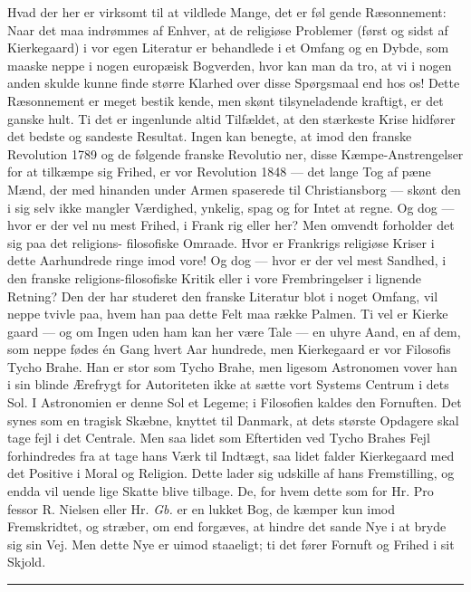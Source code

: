 \documentclass[12pt,a4paper,openany]{book}
\newcommand{\piecerule}{\par\begin{center}\rule{1.5cm}{0.4pt}\end{center}\par}
\newcommand{\opage}[1]{\marginnote{\footnotesize\textit{[#1]}}}
\begin{document}
Hvad der her er virksomt til at vildlede Mange, det er føl\-%
gende Ræsonnement: Naar det maa indrømmes af Enhver, at
de religiøse Problemer (først og sidst af Kierkegaard) i vor egen
Literatur er behandlede i et Omfang og en Dybde, som maaske
neppe i nogen europæisk Bogverden, hvor kan man da tro, at
vi i nogen anden skulde kunne finde større Klarhed over disse
Spørgsmaal end hos os! Dette Ræsonnement er meget bestik\-%
kende, men skønt tilsyneladende kraftigt, er det ganske hult. Ti
det er ingenlunde altid Tilfældet, at den stærkeste Krise hidfører
det bedste og sandeste Resultat. Ingen kan benegte, at imod
den franske Revolution 1789 og de følgende franske Revolutio\-%
ner, disse Kæmpe-Anstrengelser for at tilkæmpe sig Frihed, er
vor Revolution 1848 --- det lange Tog af pæne Mænd, der med
hinanden under Armen spaserede til Christiansborg --- skønt den
i sig selv ikke mangler Værdighed, ynkelig, spag og for Intet
at regne. Og dog --- hvor er der vel nu mest Frihed, i Frank\-%
rig eller her? Men omvendt forholder det sig paa det religions-%
filosofiske Omraade. Hvor er Frankrigs religiøse Kriser i dette
Aarhundrede ringe imod vore! Og dog --- hvor er der vel mest
\opage{97}Sandhed, i den franske religions-filosofiske Kritik eller i vore
Frembringelser i lignende Retning? Den der har studeret den
franske Literatur blot i noget Omfang, vil neppe tvivle paa,
hvem han paa dette Felt maa række Palmen. Ti vel er Kierke\-%
gaard --- og om Ingen uden ham kan her være Tale --- en
uhyre Aand, en af dem, som neppe fødes én Gang hvert Aar\-%
hundrede, men Kierkegaard er vor Filosofis Tycho Brahe. Han
er stor som Tycho Brahe, men ligesom Astronomen vover han
i sin blinde Ærefrygt for Autoriteten ikke at sætte vort Systems
Centrum i dets Sol. I Astronomien er denne Sol et Legeme; i
Filosofien kaldes den Fornuften. Det synes som en tragisk
Skæbne, knyttet til Danmark, at dets største Opdagere skal tage
fejl i det Centrale. Men saa lidet som Eftertiden ved Tycho
Brahes Fejl forhindredes fra at tage hans Værk til Indtægt, saa
lidet falder Kierkegaard med det Positive i Moral og Religion.
Dette lader sig udskille af hans Fremstilling, og endda vil uende\-%
lige Skatte blive tilbage. De, for hvem dette som for Hr. Pro\-%
fessor R. Nielsen eller Hr. \emph{Gb.} er en lukket Bog, de kæmper
kun imod Fremskridtet, og stræber, om end forgæves, at hindre
det sande Nye i at bryde sig sin Vej. Men dette Nye er uimod\-%
staaeligt; ti det fører Fornuft og Frihed i sit Skjold.
\piecerule
\end{document}
